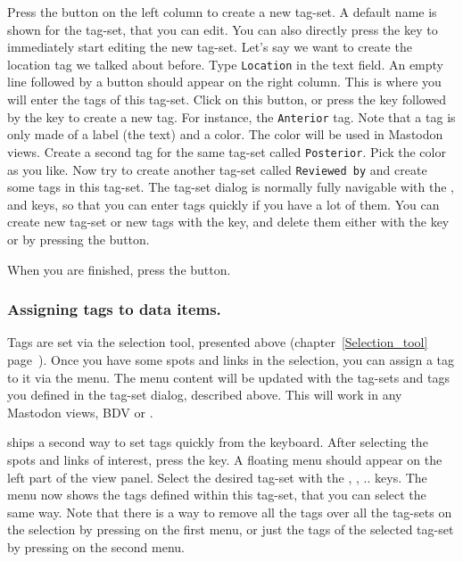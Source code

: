 Press the  button on the left column to create a new tag-set. 
A default name is shown for the tag-set, that you can edit.
You can also directly press the  \keys{\return} key to immediately start editing the new tag-set.
Let's say we want to create the location tag we talked about before.
Type \texttt{Location} in the text field. 
An empty line followed by a  button should appear on the right column.
This is where you will enter the tags of this tag-set.
Click on this button, or press the \keys{\tab} key followed by the \keys{\return} key to create a new tag.
For instance, the \texttt{Anterior} tag.
Note that a tag is only made of a label (the text) and a color.
The color will be used in Mastodon views.
Create a second tag for the same tag-set called \texttt{Posterior}.
Pick the color as you like. 
Now try to create another tag-set called \texttt{Reviewed by} and create some tags in this tag-set. 
The tag-set dialog is normally fully navigable with the \keys{\tab}, \keys{\arrowkeyup} and \keys{\arrowkeydown} keys, so that you can enter tags quickly if you have a lot of them.
You can create new tag-set or new tags with the \keys{\return} key, and delete them either with the \keys{\del} key or by pressing the  button.

When you are finished, press the  button.



\subsubsection{Assigning tags to data items.}

Tags are set via the selection tool, presented above (chapter~\ref{Selection_tool} page~\pageref{Selection_tool}).
Once you have some spots and links in the selection, you can assign a tag to it via the  menu.
The menu content will be updated with the tag-sets and tags you defined in the tag-set dialog, described above.
This will work in any Mastodon views, BDV or \TrackScheme.

\TrackScheme ships a second way to set tags quickly from the keyboard.
After selecting the spots and links of interest, press the  key.
A floating menu should appear on the left part of the view panel. 
Select the desired tag-set with the , , .. keys.
The menu now shows the tags defined within this tag-set, that you can select the same way.
Note that there is a way to remove all the tags over all the tag-sets on the selection by pressing \keys{\shift+\del} on the first menu, or just the tags of the selected tag-set by pressing  on the second menu.



